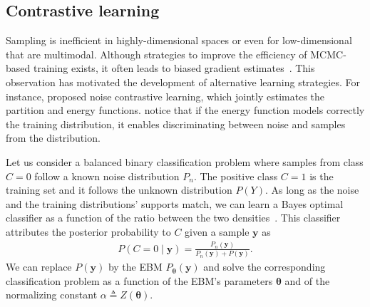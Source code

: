 \subsection{Contrastive learning}
Sampling is inefficient in highly-dimensional spaces or even for low-dimensional that are multimodal. Although strategies to improve the efficiency of MCMC-based training exists, it often leads to biased gradient estimates~\citep{fischer2011bounding}. This observation has motivated the development of alternative learning strategies. For instance, \citet{gutmann2012noise} proposed noise contrastive learning, which jointly estimates the partition and energy functions. \citet{gutmann2012noise} notice that if the energy function models correctly the training distribution, it enables discriminating between noise and samples from the distribution.

Let us consider a balanced binary classification problem where samples from class $C=0$ follow a known noise distribution $P_n$. The positive class $C=1$ is the training set and it follows the unknown distribution $P(Y)$. As long as the noise and the training distributions' supports match, we can learn a Bayes optimal classifier as a function of the ratio between the two densities~\citep{devroye2013probabilistic, farago1993strong}. This classifier attributes the posterior probability to $C$ given a sample $\mathbf{y}$ as
\begin{align}
  P(C=0 \mid \mathbf{y}) = \frac{P_n(\mathbf{y})}{P_n(\mathbf{y}) + P(\mathbf{y})}. \label{eq:CL}
\end{align}
We can replace $P(\mathbf{y})$ by the EBM $P_{\bm{\theta}}(\bm{y})$ and solve the corresponding classification problem as a function of the EBM's parameters $\bm{\theta}$ and of the normalizing constant $\alpha \triangleq Z(\bm{\theta})$.

